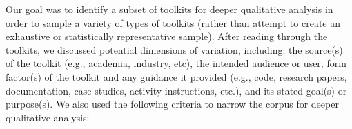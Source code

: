 \documentclass[acmsmall]{acmart}
\begin{document}
Our goal was to identify a subset of toolkits for deeper qualitative analysis in order to sample a variety of types of toolkits (rather than attempt to create an exhaustive or statistically representative sample). After reading through the toolkits, we discussed potential dimensions of variation, including: the source(s) of the toolkit (e.g., academia, industry, etc), the intended audience or user, form factor(s) of the toolkit and any guidance it provided (e.g., code, research papers, documentation, case studies, activity instructions, etc.), and its stated goal(s) or purpose(s).
 We also used the following criteria to narrow the corpus for deeper qualitative analysis: 
\end{document}
